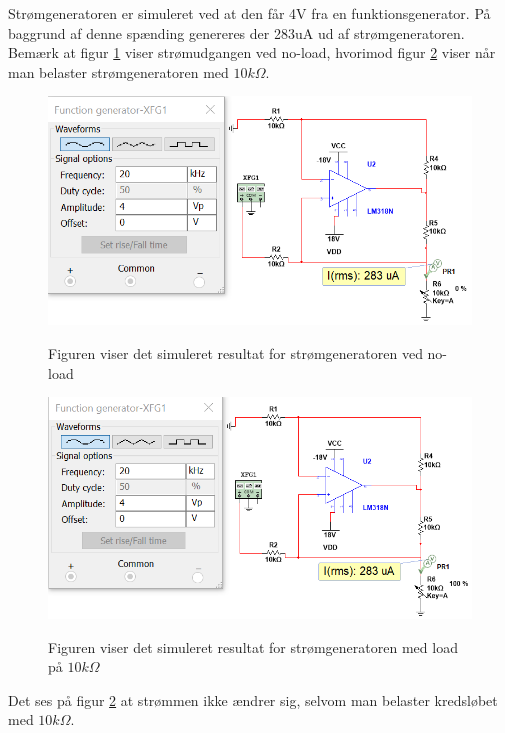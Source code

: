 Strømgeneratoren er simuleret ved at den får 4V fra en funktionsgenerator. På baggrund af denne spænding genereres der 283uA ud af strømgeneratoren. Bemærk at figur \ref{SimTestStrom} viser strømudgangen ved no-load, hvorimod figur \ref{SimTestStromNoLoad} viser når man belaster strømgeneratoren med $ 10k\Omega$.  

\begin{figure}[H] 
\centering
{\includegraphics[width=\linewidth]
{Figure/SimuleretStromGenerator}}
\caption{Figuren viser det simuleret resultat for  strømgeneratoren ved no-load}
\label{SimTestStrom}
\end{figure}



\begin{figure}[H] 
\centering
{\includegraphics[width=\linewidth]
{Figure/SimuleretStromMedLoad}}
\caption{Figuren viser det simuleret resultat for  strømgeneratoren med load på $10k\Omega$}
\label{SimTestStromNoLoad}
\end{figure}

Det ses på figur \ref{SimTestStromNoLoad} at strømmen ikke ændrer sig, selvom man belaster kredsløbet med $ 10k\Omega	$.   



